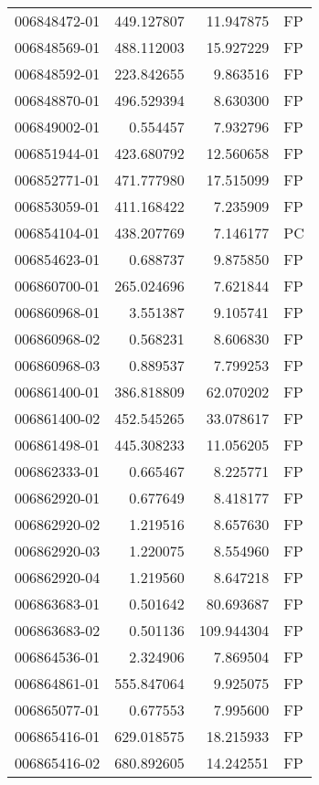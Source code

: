 \begin{tabular}{lrrl}
006848472-01 &  449.127807 &    11.947875 &   FP \\
006848569-01 &  488.112003 &    15.927229 &   FP \\
006848592-01 &  223.842655 &     9.863516 &   FP \\
006848870-01 &  496.529394 &     8.630300 &   FP \\
006849002-01 &    0.554457 &     7.932796 &   FP \\
006851944-01 &  423.680792 &    12.560658 &   FP \\
006852771-01 &  471.777980 &    17.515099 &   FP \\
006853059-01 &  411.168422 &     7.235909 &   FP \\
006854104-01 &  438.207769 &     7.146177 &   PC \\
006854623-01 &    0.688737 &     9.875850 &   FP \\
006860700-01 &  265.024696 &     7.621844 &   FP \\
006860968-01 &    3.551387 &     9.105741 &   FP \\
006860968-02 &    0.568231 &     8.606830 &   FP \\
006860968-03 &    0.889537 &     7.799253 &   FP \\
006861400-01 &  386.818809 &    62.070202 &   FP \\
006861400-02 &  452.545265 &    33.078617 &   FP \\
006861498-01 &  445.308233 &    11.056205 &   FP \\
006862333-01 &    0.665467 &     8.225771 &   FP \\
006862920-01 &    0.677649 &     8.418177 &   FP \\
006862920-02 &    1.219516 &     8.657630 &   FP \\
006862920-03 &    1.220075 &     8.554960 &   FP \\
006862920-04 &    1.219560 &     8.647218 &   FP \\
006863683-01 &    0.501642 &    80.693687 &   FP \\
006863683-02 &    0.501136 &   109.944304 &   FP \\
006864536-01 &    2.324906 &     7.869504 &   FP \\
006864861-01 &  555.847064 &     9.925075 &   FP \\
006865077-01 &    0.677553 &     7.995600 &   FP \\
006865416-01 &  629.018575 &    18.215933 &   FP \\
006865416-02 &  680.892605 &    14.242551 &   FP \\

\end{tabular}
